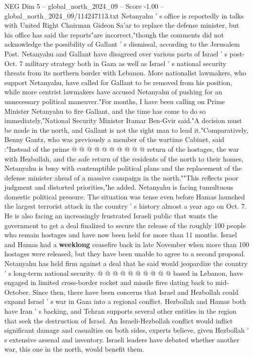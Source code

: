 \begin{textsample}{NEG Dim 5 – global\_north\_2024\_09 – Score -1.00 – global\_north\_2024\_09/114247113.txt}  \label{ex:f5_neg_091}
Netanyahu ' s office is reportedly in talks with United Right Chairman Gideon Sa'ar to replace the defense minister, but his office has said the reports"are incorrect,"though the comments did not acknowledge the possibility of Gallant ' s dismissal, according to the Jerusalem Post.
Netanyahu and Gallant have disagreed over various parts of Israel ' s post-Oct. 7 military strategy both in Gaza as well as Israel ' s national security threats from its northern border with Lebanon.
More nationalist lawmakers, who support Netanyahu, have called for Gallant to be removed from his position, while more centrist lawmakers have accused Netanyahu of pushing for an unnecessary political maneuver."For months, I have been calling on Prime Minister Netanyahu to fire Gallant, and the time has come to do so immediately,"National Security Minister Itamar Ben-Gvir said."A decision must be made in the north, and Gallant is not the right man to lead it."Comparatively, Benny Gantz, who was previously a member of the wartime Cabinet, said :"Instead of the prime @ @ @ @ @ @ @ @ @ @ return of the hostages, the war with Hezbollah, and the safe return of the residents of the north to their homes, Netanyahu is busy with contemptible political plans and the replacement of the defense minister ahead of a massive campaign in the north.""This reflects poor judgment and distorted priorities,"he added.
Netanyahu is facing tumultuous domestic political pressure.
The situation was tense even before Hamas launched the largest terrorist attack in the country ' s history almost a year ago on Oct. 7.
He is also facing an increasingly frustrated Israeli public that wants the government to get a deal finalized to secure the release of the roughly 100 people who remain hostages and have now been held for more than 11 months.
Israel and Hamas had a \textbf{weeklong} ceasefire back in late November when more than 100 hostages were released, but they have been unable to agree to a second proposal.
Netanyahu has held firm against a deal that he said would jeopardize the country ' s long-term national security. @ @ @ @ @ @ @ @ @ @ based in Lebanon, have engaged in limited cross-border rocket and missile fires dating back to mid-October.
Since then, there have been concerns that Israel and Hezbollah could expand Israel ' s war in Gaza into a regional conflict.
Hezbollah and Hamas both have Iran ' s backing, and Tehran supports several other entities in the region that seek the destruction of Israel.
An Israeli-Hezbollah conflict would inflict significant damage and casualties on both sides, experts believe, given Hezbollah ' s extensive arsenal and inventory.
Israeli leaders have debated whether another war, this one in the north, would benefit them.

\end{textsample}
